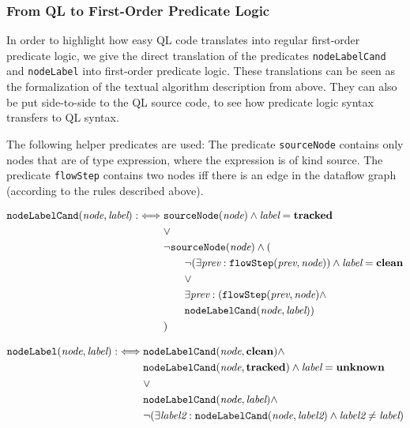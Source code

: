 \subsubsection*{From QL to First-Order Predicate Logic}
In order to highlight how easy QL code translates into regular first-order predicate logic,
we give the direct translation of the predicates \texttt{nodeLabelCand} and \texttt{nodeLabel}
into first-order predicate logic.
These translations can be seen as the formalization of the textual algorithm description
from above.
They can also be put side-to-side to the QL source code, to see how predicate logic
syntax transfers to QL syntax.

The following helper predicates are used:
The predicate \texttt{sourceNode} contains only nodes that are of type expression,
where the expression is of kind source.
The predicate \texttt{flowStep} contains two nodes iff there is an edge in the dataflow 
graph (according to the rules described above).

\newcommand{\n}{\textit{node}}
\newcommand{\lab}{\textit{label}}
\newcommand{\labtwo}{\textit{label2}}
\newcommand{\prev}{\textit{prev}}
\begin{align*}
    \texttt{nodeLabelCand}(\n, \lab) :\iff &\texttt{sourceNode}(\n) \land \lab = \labtracked \\
    &\lor\\
    & \neg \texttt{sourceNode}(\n) \land (\\
    &\qquad\neg(\exists \prev: \texttt{flowStep}(\prev, \n)) \land \lab = \labclean\\
    &\qquad\lor\\
    &\qquad\exists \prev: (\texttt{flowStep}(\prev, \n) \land\\
    &\qquad \texttt{nodeLabelCand}(\n, \lab))\\
    &)
\end{align*}

\begin{align*}
    \texttt{nodeLabel}(\n, \lab) :\iff &\texttt{nodeLabelCand}(\n, \labclean) \land \\
    &\texttt{nodeLabelCand}(\n, \labtracked) \land \lab = \labunknown \\
    &\lor\\
    & \texttt{nodeLabelCand}(\n, \lab) \land\\
    &\neg (\exists \labtwo: \texttt{nodeLabelCand}(\n, \labtwo) \land \labtwo \neq \lab)\\
\end{align*}

